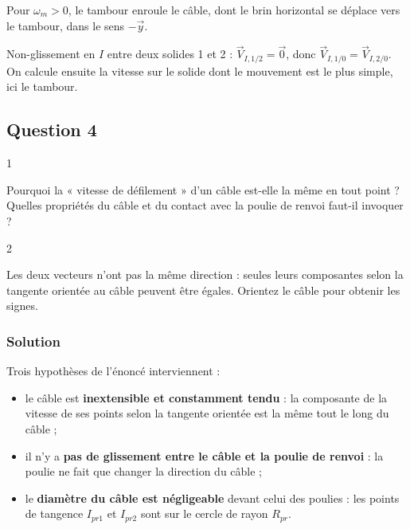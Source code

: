 \documentclass[11pt,a4paper]{article}
\providecommand{\tightlist}{\setlength{\itemsep}{0pt}\setlength{\parskip}{0pt}}
\begin{document}
Pour \(\omega_m>0\), le tambour enroule le câble, dont le brin horizontal se déplace vers le tambour, dans le sens \(-\vec y\).

\begin{methode}

Non-glissement en \(I\) entre deux solides 1 et 2 : \(\vec V_{I,1/2}=\vec 0\), donc \(\vec V_{I,1/0}=\vec V_{I,2/0}\). On calcule ensuite la vitesse sur le solide dont le mouvement est le plus simple, ici le tambour.

\end{methode}

\hypertarget{question-4}{%
\subsection{Question 4}\label{question-4}}

\begin{indication}{1}

Pourquoi la « vitesse de défilement » d'un câble est-elle la même en tout point ? Quelles propriétés du câble et du contact avec la poulie de renvoi faut-il invoquer ?

\end{indication}

\begin{indication}{2}

Les deux vecteurs n'ont pas la même direction : seules leurs composantes selon la tangente orientée au câble peuvent être égales. Orientez le câble pour obtenir les signes.

\end{indication}

\hypertarget{solution-3}{%
\subsubsection{Solution}\label{solution-3}}

Trois hypothèses de l'énoncé interviennent :

\begin{itemize}
\tightlist
\item
  le câble est \textbf{inextensible et constamment tendu} : la composante de la vitesse de ses points selon la tangente orientée est la même tout le long du câble ;
\item
  il n'y a \textbf{pas de glissement entre le câble et la poulie de renvoi} : la poulie ne fait que changer la direction du câble ;
\item
  le \textbf{diamètre du câble est négligeable} devant celui des poulies : les points de tangence \(I_{pr1}\) et \(I_{pr2}\) sont sur le cercle de rayon \(R_{pr}\).
\end{itemize}
\end{document}
